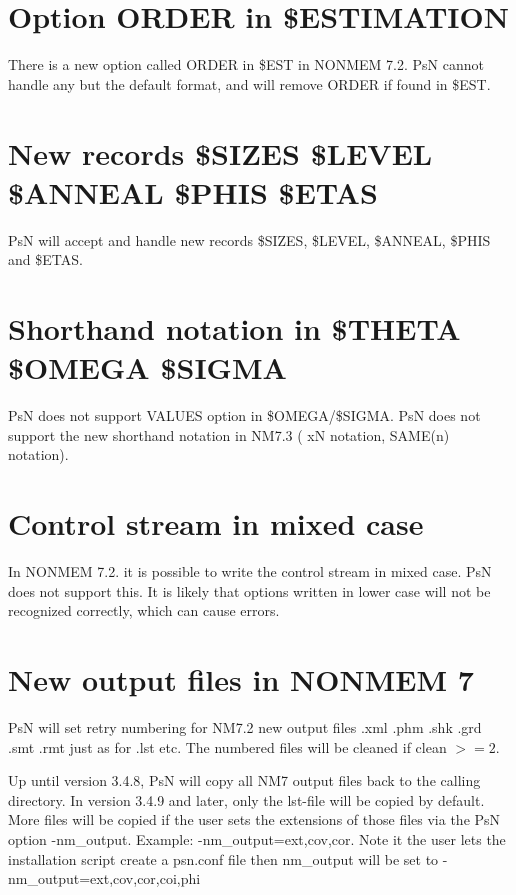 \section{Option ORDER in \$ESTIMATION}

There is a new option called ORDER in \$EST in NONMEM 7.2. PsN cannot handle any but the default format, and will remove ORDER if found in \$EST.

\section{New records \$SIZES \$LEVEL \$ANNEAL \$PHIS \$ETAS}

PsN will accept and handle new records \$SIZES, \$LEVEL, \$ANNEAL, \$PHIS and \$ETAS.

\section{Shorthand notation in \$THETA \$OMEGA \$SIGMA}

PsN does not support VALUES option in \$OMEGA/\$SIGMA. PsN does not support the new shorthand notation in NM7.3 ( xN notation, SAME(n) notation).

\section{Control stream in mixed case}

In NONMEM 7.2. it is possible to write the control stream in mixed case. PsN does not support this. It is likely that options written in lower case will not be recognized correctly, which can cause errors.

\section{New output files in NONMEM 7}

PsN will set retry numbering for NM7.2 new output files .xml .phm .shk .grd .smt .rmt just as for .lst etc. The numbered files will be cleaned if clean $>=2$.

Up until version 3.4.8, PsN will copy all NM7 output files back to the calling directory. In version 3.4.9 and later, only the lst-file will be copied by default. More files will be copied if the user sets the extensions of those files via the PsN option -nm\_output. Example: -nm\_output=ext,cov,cor. Note it the user lets the installation script create a psn.conf file then nm\_output will be set to -nm\_output=ext,cov,cor,coi,phi 

